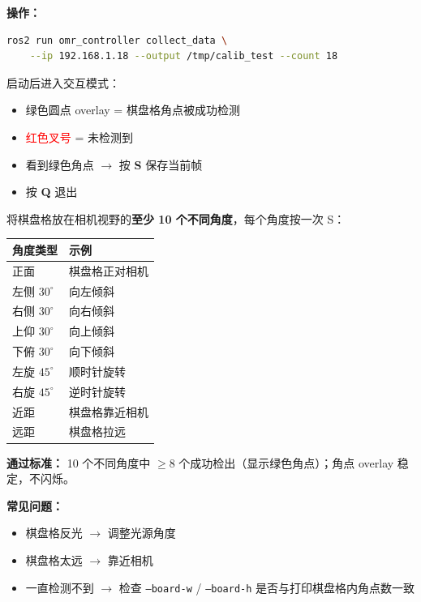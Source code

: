 \documentclass[12pt,a4paper,fontset=ubuntu]{ctexart}
\newcommand{\passcriteria}[1]{%
  \textbf{通过标准：} #1%
}
\begin{document}
\textbf{操作：}

\begin{lstlisting}[language=bash]
ros2 run omr_controller collect_data \
    --ip 192.168.1.18 --output /tmp/calib_test --count 18
\end{lstlisting}

启动后进入交互模式：
\begin{itemize}[nosep]
  \item \textcolor{green!60!black}{绿色圆点 overlay} = 棋盘格角点被成功检测
  \item \textcolor{red}{红色叉号} = 未检测到
  \item 看到绿色角点 $\rightarrow$ 按 \textbf{S} 保存当前帧
  \item 按 \textbf{Q} 退出
\end{itemize}

将棋盘格放在相机视野的\textbf{至少 10 个不同角度}，每个角度按一次 S：

\begin{center}
\begin{tabular}{@{}ll@{}}
  \toprule
  角度类型 & 示例 \\
  \midrule
  正面 & 棋盘格正对相机 \\
  左侧 $30^\circ$ & 向左倾斜 \\
  右侧 $30^\circ$ & 向右倾斜 \\
  上仰 $30^\circ$ & 向上倾斜 \\
  下俯 $30^\circ$ & 向下倾斜 \\
  左旋 $45^\circ$ & 顺时针旋转 \\
  右旋 $45^\circ$ & 逆时针旋转 \\
  近距 & 棋盘格靠近相机 \\
  远距 & 棋盘格拉远 \\
  \bottomrule
\end{tabular}
\end{center}

\passcriteria{
  10 个不同角度中 $\ge 8$ 个成功检出（显示绿色角点）；角点 overlay 稳定，不闪烁。
}

\begin{warnbox}
\textbf{常见问题：}
\begin{itemize}[nosep]
  \item 棋盘格反光 $\rightarrow$ 调整光源角度
  \item 棋盘格太远 $\rightarrow$ 靠近相机
  \item 一直检测不到 $\rightarrow$ 检查 \texttt{--board-w} / \texttt{--board-h} 是否与打印棋盘格内角点数一致
\end{itemize}
\end{warnbox}
\end{document}
